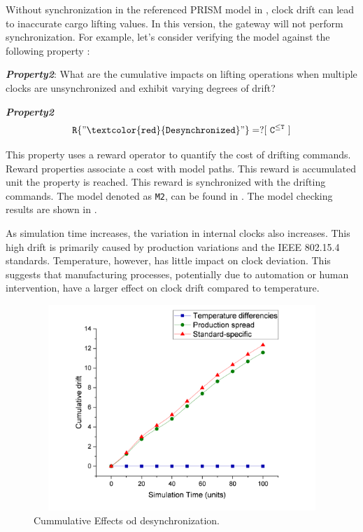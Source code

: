Without synchronization in the referenced PRISM model  in \cite{csi2023}, clock drift can lead to inaccurate cargo lifting values. In this version, the gateway will not perform synchronization. For example, let's consider verifying the model against the following property :

\begin{framed}
\emph{\bfseries{Property2}}: What are the cumulative impacts on lifting operations when multiple clocks are unsynchronized and exhibit varying degrees of drift?
\end{framed}



	    \begin{resp}{\textbf{\textit{Property2}}}
        \begin{equation}
        \label{eqreward}
         \mathtt{ R\{"\textcolor{red}{Desynchronized}"\}=? [ \ C^{ \leq T} \  ]} 
        \end{equation}
        \end{resp}
        \normalsize

This property uses a reward operator to quantify the cost of drifting commands. Reward properties associate a cost with model paths. This reward is accumulated unit the property is reached. This reward is synchronized with the drifting commands. The model denoted as \texttt{M2}, can be found in \cite{csi2023}. The model checking results are shown in . 


As simulation time increases, the variation in internal clocks also increases. This high drift is primarily caused by production variations and the IEEE 802.15.4 standards. Temperature, however, has little impact on clock deviation. This suggests that manufacturing processes, potentially due to automation or human intervention, have a larger effect on clock drift compared to temperature. 

\noindent
\begin{figure}[!htbp]
    \centering
    		\includegraphics[width=340pt, height =220pt]{driftclock.pdf}
    \caption{Cummulative Effects od desynchronization.}
    \label{fig:usecase:cranes:graphic:plot:desynch}
\end{figure} 




